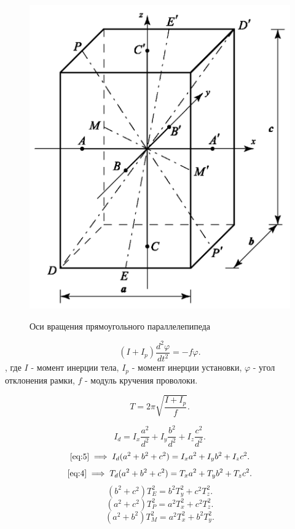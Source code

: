 \documentclass[a4paper,12pt]{article} %
\begin{document}
\begin{figure} [H]
	\includegraphics[scale = 0.3]{data/рис. 3.png}
	\label{pic:3} \caption[Рис. 3]{Оси вращения прямоугольного параллелепипеда}
\end{figure}

\begin{equation} (I + I_p) \frac{d^2\varphi}{dt^2} = -f\varphi. \label{eq:3} \end{equation}, где 
$I$ - момент инерции тела, 
$I_p$ - момент инерции установки, 
$\varphi$ - угол отклонения рамки, 
$f$ - модуль кру­чения проволоки.

\begin{equation} T = 2\pi \sqrt{\frac{I+I_p}{f}}. \label{eq:4} \end{equation}


\begin{equation} I_d = I_x \frac{a^2}{d^2} + I_y \frac{b^2}{d^2} + I_z \frac{c^2}{d^2}. \label{eq:5} \end{equation}
\begin{equation} \eqref{eq:5} \implies I_d (a^2 + b^2 + c^2) = I_x a^2 + I_y b^2 + I_z c^2. \label{eq:6} \end{equation}
\begin{equation} \eqref{eq:4} \implies T_d (a^2 + b^2 + c^2) = T_x a^2 + T_y b^2 + T_z c^2. \label{eq:7} \end{equation}
\begin{equation} (b^2 + c^2)T_E^2 = b^2 T_y^2 + c^2 T_z^2. \label{eq:8} \end{equation}
\begin{equation} (a^2 + c^2)T_P^2 = a^2 T_x^2 + c^2 T_z^2. \label{eq:9} \end{equation}
\begin{equation} (a^2 + b^2)T_M^2 = a^2 T_x^2 + b^2 T_y^2. \label{eq:10} \end{equation}
\end{document}
